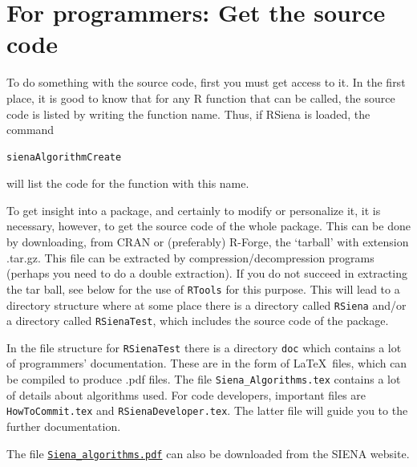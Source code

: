 \documentclass[a4paper,fleqn,11pt]{article}
\newcommand{\+}{\, + \,}
\newcommand{\sfn}[1]{\textsf{#1}}
\newcommand{\R}{{\sf R }}
\newcommand{\RS}{{\sf RSiena }}
\newcommand{\SI}{{\sf SIENA }}
\begin{document}
\newpage

\section{For programmers: Get the source code}

To do something with the source code,
first you must get access to it.
In the first place, it is good to know that for any \R function
that can be called,
the source code is listed by writing the function name.
Thus, if \RS is loaded, the command
\begin{verbatim}
sienaAlgorithmCreate
\end{verbatim}
will list the code for the function with this name.

To get insight into a package, and certainly to modify
or personalize it, it is necessary, however,
to get the source code of the whole package.
This can be done by downloading, from CRAN or (preferably) R-Forge,
the `tarball' with extension \sfn{.tar.gz}.
This file can be extracted by compression/decompression
programs (perhaps you need to do a double extraction).
If you do not succeed in extracting the tar ball, see below
for the use of \texttt{RTools} for this purpose.
This will lead to a directory structure where at some place
there is a directory called \texttt{RSiena} and/or a directory
called \texttt{RSienaTest}, which includes the source code
of the package.

In the file structure for \texttt{RSienaTest} there is a directory
\texttt{doc} which contains a lot of programmers' documentation.
These are in the form of \LaTeX \ files, which can be compiled
to produce .pdf files.
The file \texttt{Siena\_Algorithms.tex} contains a lot of details
about algorithms used.
For code developers, important files are
\texttt{HowToCommit.tex} and \texttt{RSienaDeveloper.tex}.
The latter file will guide you to the further documentation.

The file
\href{http://www.stats.ox.ac.uk/~snijders/siena/Siena_algorithms.pdf}{\texttt{Siena\_algorithms.pdf}}
can also be downloaded from the
\SI website.
\end{document}
